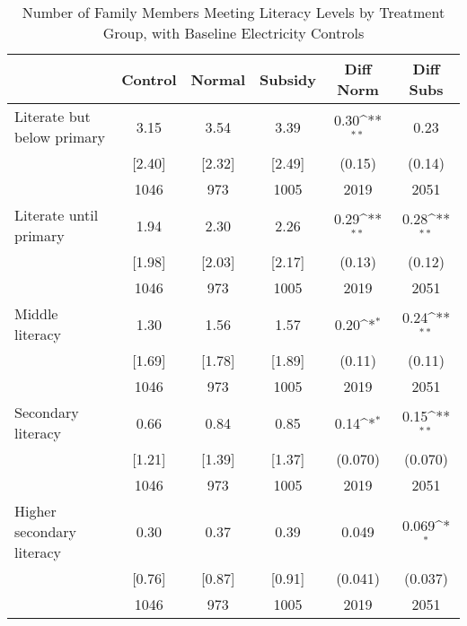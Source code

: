 \begin{table}[htbp]\centering
\def\sym#1{\ifmmode^{#1}\else\(^{#1}\)\fi}
\caption{Number of Family Members Meeting Literacy Levels by Treatment Group, with Baseline Electricity Controls \label{tab:"balance"}}
\begin{tabular*}{0.9\hsize}{@{\hskip\tabcolsep\extracolsep\fill}l*{1}{ccccc}}
\toprule
                                &  Control&   Normal&  Subsidy&Diff Norm         &Diff Subs         \\
\midrule
Literate but below primary      &     3.15&     3.54&     3.39&     0.30\sym{**} &     0.23         \\
                                &   [2.40]&   [2.32]&   [2.49]&   (0.15)         &   (0.14)         \\
                                &     1046&      973&     1005&     2019         &     2051         \\
Literate until primary          &     1.94&     2.30&     2.26&     0.29\sym{**} &     0.28\sym{**} \\
                                &   [1.98]&   [2.03]&   [2.17]&   (0.13)         &   (0.12)         \\
                                &     1046&      973&     1005&     2019         &     2051         \\
Middle literacy                 &     1.30&     1.56&     1.57&     0.20\sym{*}  &     0.24\sym{**} \\
                                &   [1.69]&   [1.78]&   [1.89]&   (0.11)         &   (0.11)         \\
                                &     1046&      973&     1005&     2019         &     2051         \\
Secondary literacy              &     0.66&     0.84&     0.85&     0.14\sym{*}  &     0.15\sym{**} \\
                                &   [1.21]&   [1.39]&   [1.37]&  (0.070)         &  (0.070)         \\
                                &     1046&      973&     1005&     2019         &     2051         \\
Higher secondary literacy       &     0.30&     0.37&     0.39&    0.049         &    0.069\sym{*}  \\
                                &   [0.76]&   [0.87]&   [0.91]&  (0.041)         &  (0.037)         \\
                                &     1046&      973&     1005&     2019         &     2051         \\

\end{tabular*}
\end{table}
